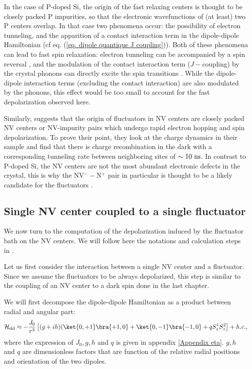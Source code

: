 \documentclass[a4paper, 11pt]{report}
\begin{document}
In the case of P-doped Si, the origin of the fast relaxing centers is thought to be closely packed P impurities, so that the electronic wavefunctions of (at least) two P centers overlap. In that case two phenomena occur: the possibility of electron tunneling, and the apparition of a contact interaction term in the dipole-dipole Hamiltonian (cf eq. (\ref{eq. dipole quantique J coupling})). Both of these phenomena can lead to fast spin relaxation: electron tunneling can be accompanied by a spin reversal \citep{sugihara1963spin}, and the modulation of the contact interaction term ($J-$coupling) by the crystal phonons can directly excite the spin transitions \citep{honig1960electron}. While the dipole-dipole interaction terms (excluding the contact interaction) are also modulated by the phonons, this effect would be too small to account for the fast depolarization observed here.

Similarly, \citep{choi2017depolarization} suggests that the origin of fluctuators in NV centers are closely packed NV centers or NV-impurity pairs which undergo rapid electron hopping and spin depolarization. To prove their point, they look at the charge dynamics in their sample and find that there is charge recombination in the dark with a corresponding tunneling rate between neighboring sites of $\sim 10\ \rm ns$. In contrast to P-doped Si, the NV centers are not the most abundant electronic defects in the crystal, this is why the NV$^--$N$^+$ pair in particular is thought to be a likely candidate for the fluctuators \citep{manson2018nv}.

\subsection{Single NV center coupled to a single fluctuator}
We now turn to the computation of the depolarization induced by the fluctuator bath on the NV centers. We will follow here the notations and calculation steps in \citep{choi2017depolarization}. 

Let us first consider the interaction between a single NV center and a fluctuator. Since we assume the fluctuators to be always depolarized, this step is similar to the coupling of an NV center to a dark spin done in the last chapter.

We will first decompose the dipole-dipole Hamiltonian as a product between radial and angular part:
\begin{equation}
\mathcal{H}_{\rm dd} \approx - \frac{J_0}{r^3} \left[(g+ih)(\ket{0,+1}\bra{+1,0}+\ket{0,-1}\bra{-1,0}+qS_z^1 S_z^2 \right] + h.c. ,
\end{equation}
where the expression of $J_0, g, h$ and $q$ is given in appendix \ref{Appendix eta}. $g, h$ and $q$ are dimensionless factors that are function of the relative radial positions and orientation of the two dipoles.
\end{document}
